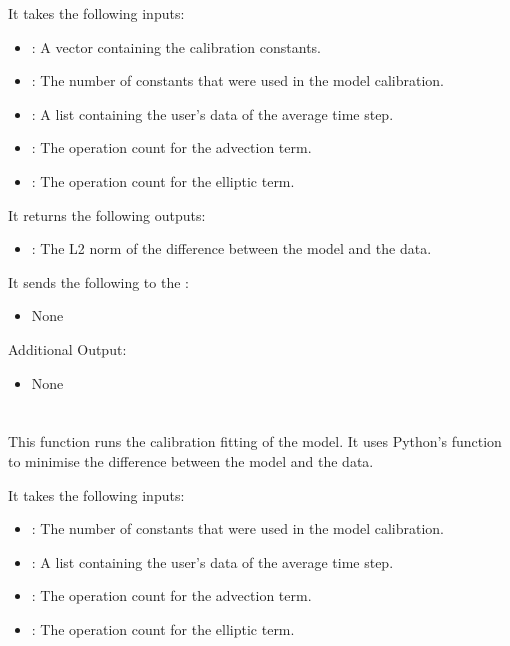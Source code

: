 It takes the following inputs:

\begin{itemize}
\item {}: A vector containing the calibration constants.
\item {}: The number of constants that were used in the model calibration.
\item {}: A list containing the user's data of the average time step.
\item {}: The operation count for the advection term.
\item {}: The operation count for the elliptic term.

\end{itemize}

It returns the following outputs:

\begin{itemize}
\item {}: The L2 norm of the difference between the model and the data.
\end{itemize}

It sends the following to the :

\begin{itemize}
\item None
\end{itemize}

Additional Output:
\begin{itemize}
\item None
\end{itemize}

\section{}
This function runs the calibration fitting of the model. It uses Python's  function to minimise the difference between the model and the data. 

It takes the following inputs:

\begin{itemize}
\item {}: The number of constants that were used in the model calibration.
\item {}: A list containing the user's data of the average time step.
\item {}: The operation count for the advection term.
\item {}: The operation count for the elliptic term.

\end{itemize}

